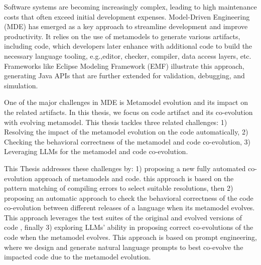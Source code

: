 Software systems are becoming increasingly complex, leading to high maintenance costs that often exceed initial development expenses. Model-Driven Engineering (MDE) has emerged as a key approach to streamline development and improve productivity. It relies on the use of metamodels to generate various artifacts, including code, which developers later enhance with additional code to build the necessary language tooling, e.g.,editor, checker, compiler, data access layers, etc. Frameworks like Eclipse Modeling Framework (EMF) illustrate this approach, generating Java APIs that are further extended for validation, debugging, and simulation.


One of the major challenges in MDE is Metamodel evolution and its impact on the related artifacts.
In this thesis, we focus on code artifact and its co-evolution with evolving metamodel.
This thesis tackles three related challenges: 1) Resolving the impact of the metamodel evolution on the code automatically, 2) Checking the behavioral correctness of the metamodel and code co-evolution, 3) Leveraging LLMs for the metamodel and code co-evolution.


This Thesis addresses these challenges by: 1) proposing a new fully automated co-evolution approach of metamodels and code. this approach is based on the pattern matching of compiling errors to select suitable resolutions, then 2) proposing an automatic approach to check the behavioral correctness of the code co-evolution between different releases of a language when its
metamodel evolves. This approach leverages the test suites of the original and evolved versions
of code , finally 3) exploring LLMs' ability in proposing correct co-evolutions of the code when the metamodel evolves. This approach is based on prompt engineering, where we design and generate natural language prompts to best co-evolve the impacted code due to the metamodel evolution. 

 

